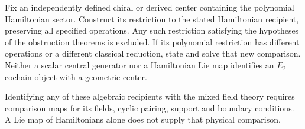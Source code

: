 \begin{problem}\label{mht:frgl:qn:full-center}
Fix an independently defined chiral or derived center containing the
polynomial Hamiltonian sector. Construct its restriction to the stated
Hamiltonian recipient, preserving all specified operations. Any such
restriction satisfying the hypotheses of the obstruction theorems is
excluded. If its polynomial restriction has different operations or a
different classical reduction, state and solve that new comparison.
Neither a scalar central generator nor a Hamiltonian Lie map identifies
an $E_2$ cochain object with a geometric center.
\end{problem}

Identifying any of these algebraic recipients with the mixed field
theory requires comparison maps for its fields, cyclic pairing,
support and boundary conditions. A Lie map of Hamiltonians alone
does not supply that physical comparison.

